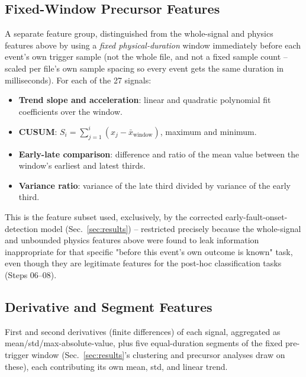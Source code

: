 \subsection{Fixed-Window Precursor Features}

A separate feature group, distinguished from the whole-signal and physics features above by using a \emph{fixed physical-duration} window immediately before each event's own trigger sample (not the whole file, and not a fixed sample count -- scaled per file's own sample spacing so every event gets the same duration in milliseconds). For each of the 27 signals:  %

\begin{itemize}
    \item \textbf{Trend slope and acceleration}: linear and quadratic polynomial fit coefficients over the window.
    \item \textbf{CUSUM}: $S_i = \sum_{j=1}^{i}(x_j - \bar{x}_{\text{window}})$, maximum and minimum.  %
    \item \textbf{Early-late comparison}: difference and ratio of the mean value between the window's earliest and latest thirds.
    \item \textbf{Variance ratio}: variance of the late third divided by variance of the early third.
\end{itemize}

This is the feature subset used, exclusively, by the corrected early-fault-onset-detection model (Sec.~\ref{sec:results}) -- restricted precisely because the whole-signal and unbounded physics features above were found to leak information inappropriate for that specific "before this event's own outcome is known" task, even though they are legitimate features for the post-hoc classification tasks (Steps 06--08). %

\subsection{Derivative and Segment Features}

First and second derivatives (finite differences) of each signal, aggregated as mean/std/max-absolute-value, plus five equal-duration segments of the fixed pre-trigger window (Sec.~\ref{sec:results}'s clustering and precursor analyses draw on these), each contributing its own mean, std, and linear trend.

